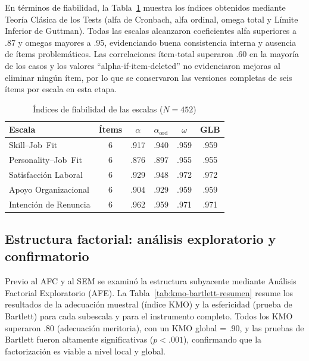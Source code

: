 En términos de fiabilidad, la Tabla \ref{tab:fiabilidad} muestra los índices obtenidos mediante Teoría Clásica de los Tests (alfa de Cronbach, alfa ordinal, omega total y Límite Inferior de Guttman). Todas las escalas alcanzaron coeficientes alfa superiores a .87 y omegas mayores a .95, evidenciando buena consistencia interna y ausencia de ítems problemáticos. Las correlaciones ítem-total superaron .60 en la mayoría de los casos y los valores “alpha-if-item-deleted” no evidenciaron mejoras al eliminar ningún ítem, por lo que se conservaron las versiones completas de seis ítems por escala en esta etapa.

\begin{table}[htbp]
\centering
\caption{Índices de fiabilidad de las escalas (\(N=452\))}
\label{tab:fiabilidad}
\small
\begin{tabular}{@{}lccccc@{}}
\toprule
\textbf{Escala} & \textbf{Ítems} & \textbf{$\alpha$} & \textbf{$\alpha_{\text{ord}}$} & \textbf{$\omega$} & \textbf{GLB} \\
\midrule
Skill--Job Fit          & 6 & .917 & .940 & .959 & .959 \\
Personality--Job Fit    & 6 & .876 & .897 & .955 & .955 \\
Satisfacción Laboral    & 6 & .929 & .948 & .972 & .972 \\
Apoyo Organizacional    & 6 & .904 & .929 & .959 & .959 \\
Intención de Renuncia   & 6 & .962 & .959 & .971 & .971 \\
\bottomrule
\end{tabular}
\end{table}

\subsection{Estructura factorial: análisis exploratorio y confirmatorio}
Previo al AFC y al SEM se examinó la estructura subyacente mediante Análisis Factorial Exploratorio (AFE). La Tabla \ref{tab:kmo-bartlett-resumen} resume los resultados de la adecuación muestral (índice KMO) y la esfericidad (prueba de Bartlett) para cada subescala y para el instrumento completo. Todos los KMO superaron .80 (adecuación meritoria), con un KMO global = .90, y las pruebas de Bartlett fueron altamente significativas ($p<.001$), confirmando que la factorización es viable a nivel local y global.

